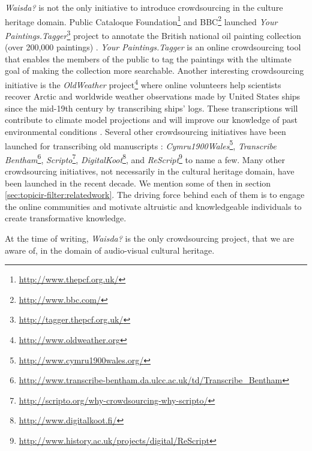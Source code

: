 \textit{Waisda?} is not the only initiative to introduce crowdsourcing in the culture heritage domain. Public Cataloque Foundation\footnote{\url{http://www.thepcf.org.uk/}} and BBC\footnote{\url{http://www.bbc.com/}} launched \textit{Your Paintings.Tagger}\footnote{\url{http://tagger.thepcf.org.uk/}} project to annotate the British national oil painting collection (over 200,000 paintings) \cite{ellis2012your}. \textit{Your Paintings.Tagger} is an online crowdsourcing tool that enables the members of the public to tag the paintings with the ultimate goal of making the collection more searchable. Another interesting crowdsourcing initiative is the \textit{OldWeather} project\footnote{\url{http://www.oldweather.org}} where online volunteers help scientists recover Arctic and worldwide weather observations made by United States ships since the mid-19th century by transcribing ships' logs. These transcriptions will contribute to climate model projections and will improve our knowledge of past environmental conditions \cite{brohan2009marine}. Several other crowdsourcing initiatives have been launched for transcribing old manuscripts \cite{causer2014many,leon2014build,chrons2011digitalkoot}: \textit{Cymru1900Wales}\footnote{\url{http://www.cymru1900wales.org/}},  \textit{Transcribe Bentham}\footnote{\url{http://www.transcribe-bentham.da.ulcc.ac.uk/td/Transcribe_Bentham}}, \textit{Scripto}\footnote{\url{http://scripto.org/why-crowdsourcing-why-scripto/}}, \textit{DigitalKoot}\footnote{\url{http://www.digitalkoot.fi/}}, and \textit{ReScript}\footnote{\url{http://www.history.ac.uk/projects/digital/ReScript}} to name a few. Many other crowdsourcing initiatives, not necessarily in the cultural heritage domain, have been launched in the recent decade. We mention some of then in section \ref{sec:topicir-filter:relatedwork}. The driving force behind each of them is to engage the online communities and motivate altruistic and knowledgeable individuals to create transformative knowledge.

At the time of writing, \textit{Waisda?} is the only crowdsourcing project, that we are aware of, in the domain of audio-visual cultural heritage.



